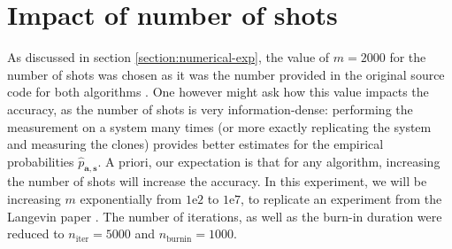 \documentclass[12pt]{memoir}
\newcommand{\mb}{\mathbf}
\newcommand{\nitern}[1]{$n_{\text{iter}}=#1$}
\newcommand{\nburninn}[1]{$n_{\text{burnin}}=#1$}
\begin{document}
\section{Impact of number of shots}\label{section:comp-nb-shots}

As discussed in section \ref{section:numerical-exp}, the value of $m=2000$ for the number of shots was chosen as it was the number provided in the original source code for both algorithms . One however might ask how this value impacts the accuracy, as the number of shots is very information-dense: performing the measurement on a system many times (or more exactly replicating the system and measuring the clones) provides better estimates for the empirical probabilities $\hat p_{\mb a, \mb s}$. A priori, our expectation is that for any algorithm, increasing the number of shots will increase the accuracy. In this experiment, we will be increasing $m$ exponentially from $1\text{e}2$ to $1\text{e}7$, to replicate an experiment from the Langevin paper \cite{meth:bayesian:Langevin:ACMT2024}. The number of iterations, as well as the burn-in duration were reduced to \nitern{5000} and \nburninn{1000}.
\end{document}
